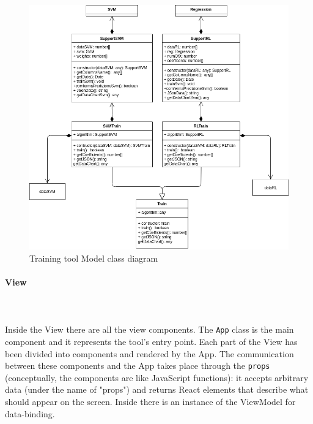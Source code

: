 \begin{figure}[H]
\centering
\includegraphics[scale=0.5]{../../../Diagrams/Classes_diagrams/tool_model.png}
\caption{Training tool Model class diagram}
\end{figure}

\paragraph{View}\mbox{} \\ \mbox{} \\
Inside the View there are all the view components.
The \texttt{App} class is the main component and it represents the tool's entry point. Each part of the View has been divided into components and rendered by the App. The communication between these components and the App takes place through the \texttt{props} (conceptually, the components are like JavaScript functions): it accepts arbitrary data (under the name of "props") and returns React elements that describe what should appear on the screen.
Inside there is an instance of the ViewModel for data-binding.

